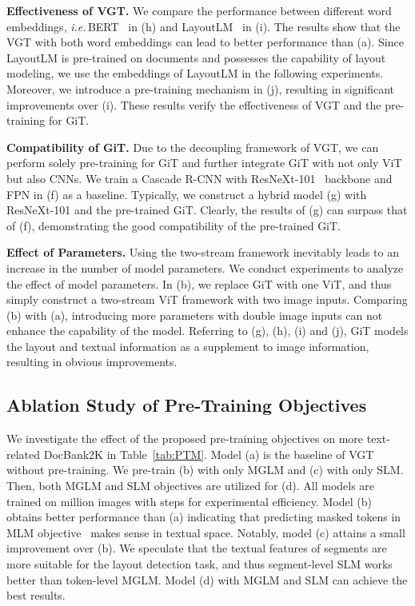 \documentclass[10pt,twocolumn,letterpaper]{article}
\def\ie{\emph{i.e.}\,}
\begin{document}
\noindent
\textbf{Effectiveness of VGT.} 
We compare the performance between different word embeddings, 
\ie BERT~\cite{devlin2018bert} in (h) and LayoutLM~\cite{xu2020layoutlm} in (i).
The results show that the VGT with both word embeddings can lead to better performance than (a).
Since LayoutLM is pre-trained on documents and possesses the capability of layout modeling,
we use the embeddings of LayoutLM in the following experiments.
Moreover, we introduce a pre-training mechanism in (j), resulting in significant improvements over (i).
These results verify the effectiveness of VGT and the pre-training for GiT.


\noindent
\textbf{Compatibility of GiT.} 
Due to the decoupling framework of VGT,
we can perform solely pre-training for GiT and further integrate GiT with not only ViT but also CNNs.
We train a Cascade R-CNN with ResNeXt-101~\cite{resnext} backbone and FPN in (f) as a baseline.
Typically, we construct a hybrid model (g) with ResNeXt-101 and the pre-trained GiT.
Clearly, the results of (g) can surpass that of (f), 
demonstrating the good compatibility of the pre-trained GiT.


\noindent
\textbf{Effect of Parameters.} 
Using the two-stream framework inevitably leads to an increase in the number of model parameters.
We conduct experiments to analyze the effect of model parameters.
In (b), we replace GiT with one ViT,  and thus simply construct a two-stream ViT framework with two image inputs.
Comparing (b) with (a), introducing more parameters with double image inputs can not enhance the capability of the model.
Referring to (g), (h), (i) and (j), GiT models the layout and textual information as a supplement to image information,
resulting in obvious improvements.

\subsection{Ablation Study of Pre-Training Objectives}
We investigate the effect of the proposed pre-training objectives on more text-related DocBank2K in Table~\ref{tab:PTM}.
Model (a) is the baseline of VGT without pre-training.
We pre-train (b) with only MGLM  and (c) with only SLM.
Then, both MGLM and SLM objectives are utilized for (d).
All models are trained on  million images with  steps for experimental efficiency.
Model (b) obtains better performance than (a)
indicating that predicting masked tokens in MLM objective~\cite{devlin2018bert} makes sense in  textual space.
Notably, model (c) attains a small improvement over (b).
We speculate that the textual features of segments are more suitable for the layout detection task, 
and thus segment-level SLM works better than token-level MGLM.
Model (d) with MGLM and SLM can achieve the best results.
\end{document}
